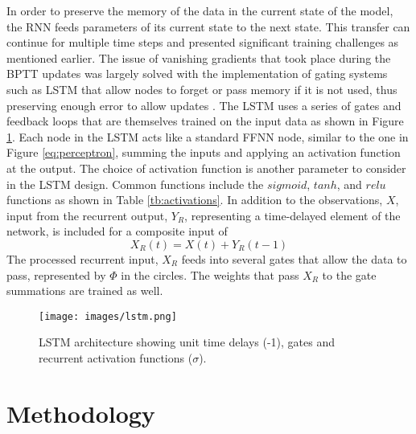 In order to preserve the memory of the data in the current state of the model, the RNN feeds parameters of its current state to the next state. This transfer can continue for multiple time steps and presented significant training challenges as mentioned earlier. The issue of vanishing gradients that took place during the BPTT updates was largely solved with the implementation of gating systems such as LSTM that allow nodes to forget or pass memory if it is not used, thus preserving enough error to allow updates \citep{Hochreiter1997}. The LSTM uses a series of gates and feedback loops that are themselves trained on the input data as shown in Figure \ref{fig:lstm}. Each node in the LSTM acts like a standard FFNN node, similar to the one in Figure \ref{eq:perceptron}, summing the inputs and applying an activation function at the output. The choice of activation function is another parameter to consider in the LSTM design. Common functions include the $sigmoid$, $tanh$, and $relu$ functions as shown in Table \ref{tb:activations}. In addition to the observations, $X$, input from the recurrent output, $Y_{R}$, representing a time-delayed element of the network, is included for a composite input of 
%
\begin{equation}
\label{eq:Xr}
X_{R}(t) = X(t) + Y_{R}(t-1)
\end{equation}
%
The processed recurrent input, $X_{R}$ feeds into several gates that allow the data to pass, represented by $\Phi$ in the circles. The weights that pass $X_{R}$ to the gate summations are trained as well.
%
\begin{figure}[H]
\centering
\texttt{[image: images/lstm.png]} 
\caption[LSTM architecture]{LSTM architecture showing unit time delays (-1), gates and recurrent activation functions ($\sigma$).}
\label{fig:lstm}
\end{figure}

\section{Methodology}


